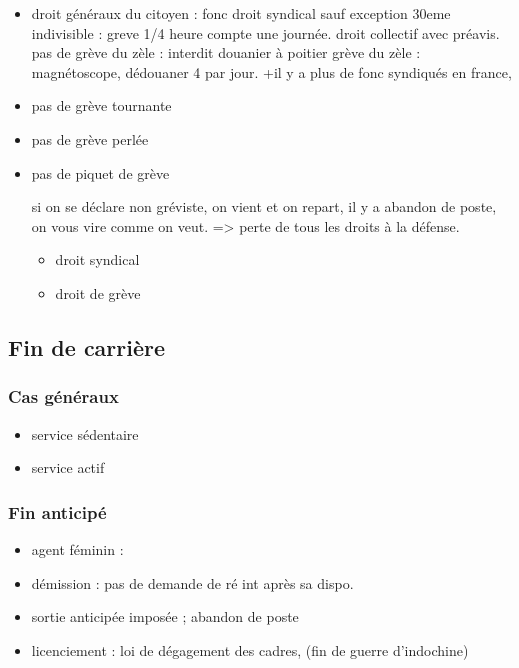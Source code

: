 \documentclass[a4paper,12pt]{article}
\begin{document}
\begin{itemize}
	\item droit généraux du citoyen : 
	fonc droit syndical sauf exception
	30eme indivisible : greve 1/4 heure compte une journée.
	droit collectif avec préavis.
	pas de grève du zèle : interdit
	douanier à poitier grève du zèle : magnétoscope, dédouaner 4 par jour. 
	+il y a plus de fonc syndiqués en france,
	\item pas de grève tournante
	\item pas de grève perlée
	\item pas de piquet de grève
	 
	 si on se déclare non gréviste, on vient et on repart, il y a abandon de poste, on vous vire comme on veut.
	 => perte de tous les droits à la défense.
	\begin{itemize}
		\item droit syndical
		\item droit de grève
	\end{itemize}
\end{itemize}



\subsection{Fin de carrière}
\subsubsection{Cas généraux}

\begin{itemize}
	\item service sédentaire
	\item service actif
\end{itemize}

\subsubsection{Fin anticipé}

\begin{itemize}
	\item agent féminin : 
	\item démission : pas de demande de ré int après sa dispo.
	\item sortie anticipée imposée ; abandon de poste
	\item licenciement : loi de dégagement des cadres, (fin de guerre d'indochine)
\end{itemize}
\end{document}
